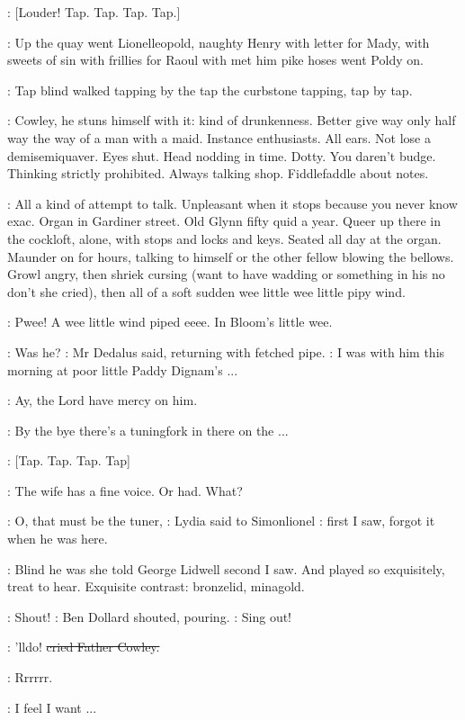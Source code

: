 \stripling:
[Louder!
Tap.
Tap.
Tap.
Tap.]

:
Up the quay went Lionelleopold,
naughty Henry with letter for
Mady,
with sweets of sin with frillies for Raoul with met him pike hoses
went Poldy on.

:
Tap blind walked
tapping by the tap the curbstone tapping,
tap by tap.

\BloomInt:
Cowley,
he stuns himself with it:
kind of drunkenness.
Better give
way only half way the way of a man with a maid.
Instance enthusiasts.
All
ears.
Not lose a demisemiquaver.
Eyes shut.
Head nodding in time.
Dotty.
You daren't budge.
Thinking strictly prohibited.
Always talking shop.
Fiddlefaddle about notes.

\BloomInt:
All a kind of attempt to talk.
Unpleasant when it stops because you
never know exac.
Organ in Gardiner street.
Old Glynn fifty quid a year.
Queer up there in the cockloft,
alone,
with stops and locks and keys.
Seated all day at the organ.
Maunder on for hours,
talking to himself or
the other fellow blowing the bellows.
Growl angry,
then shriek cursing
(want to have wadding or something in his no don't she cried),
then all of
a soft sudden wee little wee little pipy wind.

:
Pwee!
A wee little wind piped eeee.
In Bloom's little wee.

\simon:
Was he?
:
Mr Dedalus said,
returning with fetched pipe.
\simon:
I was with him this morning at poor little Paddy Dignam's ...

\cowley:
Ay,
the Lord have mercy on him.

\simon:
By the bye there's a tuningfork in there on the ...

\stripling:
[Tap.
Tap.
Tap.
Tap]

\lidwell:
The wife has a fine voice.
Or had.
What?

\MissD:
O,
that must be the tuner,
:
Lydia said to Simonlionel
\MissD:
first I saw,
forgot
it when he was here.

:
Blind he was she told George Lidwell second I saw.
And played so
exquisitely,
treat to hear.
Exquisite contrast:
bronzelid,
minagold.

\dollard:
Shout!
:
Ben Dollard shouted,
pouring.
\dollard:
Sing out!

\cowley:
'lldo!
\sout{cried Father Cowley.}

:
Rrrrrr.

\BloomInt:
I feel I want ...

